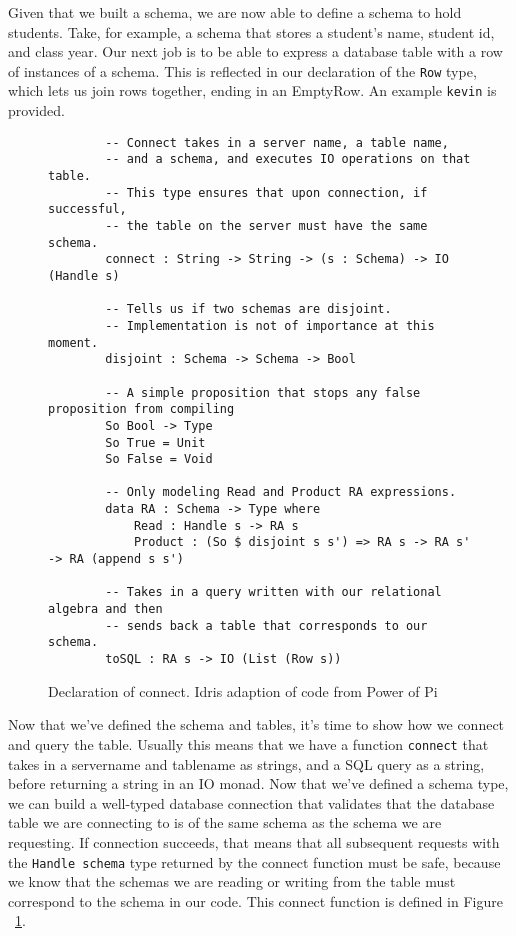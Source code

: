 Given that we built a schema, we are now able to define a schema to hold
students. Take, for example, a schema that stores a student's name, student id,
and class year. Our next job is to be able to express a database table with a
row of instances of a schema. This is reflected in our declaration of the
\texttt{Row} type, which lets us join rows together, ending in an EmptyRow. An
example \texttt{kevin} is provided. 

\begin{figure}[ht!]
    \caption{Declaration of connect. Idris adaption of code from Power of Pi
    \protect\cite{power_of_pi}}
    \label{connect}
    \begin{lstlisting}
        -- Connect takes in a server name, a table name, 
        -- and a schema, and executes IO operations on that table. 
        -- This type ensures that upon connection, if successful, 
        -- the table on the server must have the same schema. 
        connect : String -> String -> (s : Schema) -> IO (Handle s)

        -- Tells us if two schemas are disjoint. 
        -- Implementation is not of importance at this moment. 
        disjoint : Schema -> Schema -> Bool

        -- A simple proposition that stops any false proposition from compiling
        So Bool -> Type
        So True = Unit
        So False = Void

        -- Only modeling Read and Product RA expressions.
        data RA : Schema -> Type where
            Read : Handle s -> RA s
            Product : (So $ disjoint s s') => RA s -> RA s' -> RA (append s s')
        
        -- Takes in a query written with our relational algebra and then 
        -- sends back a table that corresponds to our schema. 
        toSQL : RA s -> IO (List (Row s))
    \end{lstlisting}
\end{figure}

Now that we've defined the schema and tables, it's time to show how we connect
and query the table. Usually this means that we have a function \texttt{connect}
that takes in a servername and tablename as strings, and a SQL query as a
string, before returning a string in an IO monad. Now that we've defined a
schema type, we can build a well-typed database connection that validates that
the database table we are connecting to is of the same schema as the schema we
are requesting. If connection succeeds, that means that all subsequent requests
with the \texttt{Handle schema} type returned by the connect function must be
safe, because we know that the schemas we are reading or writing from the table
must correspond to the schema in our code. This connect function is defined in
Figure ~\ref{connect}. 

